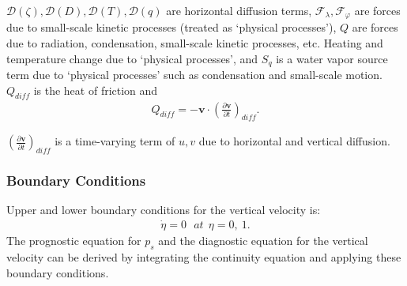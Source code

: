 \({\mathcal D}(\zeta), {\mathcal D}(D), {\mathcal D}(T), {\mathcal D}(q)\)
are horizontal diffusion terms,
\({\mathcal F}_\lambda, {\mathcal F}_\varphi\) are forces due to
small-scale kinetic processes (treated as `physical processes'), \(Q\)
are forces due to radiation, condensation, small-scale kinetic
processes, etc. Heating and temperature change due to `physical
processes', and \(S_q\) is a water vapor source term due to `physical
processes' such as condensation and small-scale motion. \(Q_{diff}\) is
the heat of friction and
\begin{eqnarray}
  Q_{diff}
 = - {\mathbf{v}} \cdot  \left( \frac{\partial {\mathbf{v}}}{\partial t} \right)_{diff} .
\end{eqnarray}

\(( \frac{\partial {\mathbf{v}}}{\partial t} )_{diff}\) is a
time-varying term of \(u,v\) due to horizontal and vertical diffusion.

\hypertarget{boundary-conditions}{%
\subsubsection{Boundary Conditions}\label{boundary-conditions}}

Upper and lower boundary conditions for the vertical velocity is:
\begin{eqnarray}
  \dot{\eta} = 0  \ \ \ at \ \ \eta = 0 , \ 1 .
\end{eqnarray}
The prognostic equation for \(p_s\) and the diagnostic equation for the
vertical velocity can be derived by integrating the continuity equation
and applying these boundary conditions.
